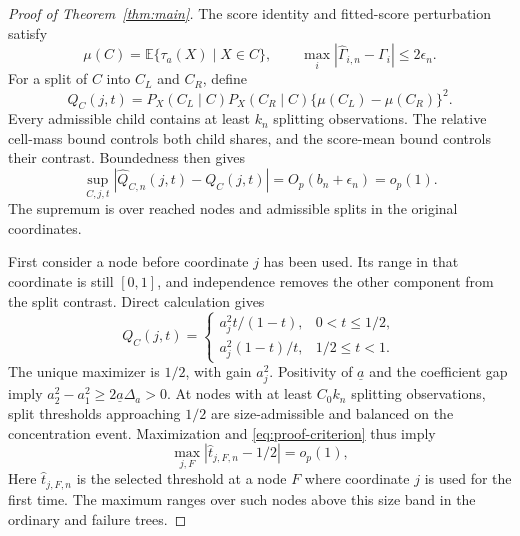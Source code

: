 \documentclass[12pt]{article}
\newcommand{\E}{\mathbb E}
\begin{document}
\begin{appendix}
\begin{proof}[Proof of Theorem~\ref{thm:main}]
The score identity and fitted-score perturbation satisfy
\[
\mu(C)=\E\{\tau_a(X)\mid X\in C\},\qquad
\max_i|\widehat\Gamma_{i,n}-\Gamma_i|\le2\epsilon_n.
\]
For a split of \(C\) into \(C_L\) and \(C_R\), define
\[
Q_C(j,t)
=P_X(C_L\mid C)P_X(C_R\mid C)
\{\mu(C_L)-\mu(C_R)\}^2.
\]
Every admissible child contains at least \(k_n\) splitting observations. The relative cell-mass bound controls both child shares, and the score-mean bound controls their contrast. Boundedness then gives
\begin{equation}\label{eq:proof-criterion}
\sup_{C,j,t}
\left|\widehat Q_{C,n}(j,t)-Q_C(j,t)\right|
=O_p(b_n+\epsilon_n)=o_p(1).
\end{equation}
The supremum is over reached nodes and admissible splits in the original coordinates.

First consider a node before coordinate \(j\) has been used. Its range in that coordinate is still \([0,1]\), and independence removes the other component from the split contrast. Direct calculation gives
\begin{equation}\label{eq:proof-shape}
Q_C(j,t)=
\begin{cases}
a_j^2t/(1-t),&0<t\le1/2,\\
a_j^2(1-t)/t,&1/2\le t<1.
\end{cases}
\end{equation}
The unique maximizer is \(1/2\), with gain \(a_j^2\). Positivity of \(\underline a\) and the coefficient gap imply \(a_2^2-a_1^2\ge2\underline a\Delta_a>0\). At nodes with at least \(C_0k_n\) splitting observations, split thresholds approaching \(1/2\) are size-admissible and balanced on the concentration event. Maximization and \eqref{eq:proof-criterion} thus imply
\begin{equation}\label{eq:proof-localization}
\max_{j,F}|\widehat t_{j,F,n}-1/2|=o_p(1),
\end{equation}
Here \(\widehat t_{j,F,n}\) is the selected threshold at a node \(F\) where coordinate \(j\) is used for the first time. The maximum ranges over such nodes above this size band in the ordinary and failure trees.


\end{proof}
\end{appendix}
\end{document}
